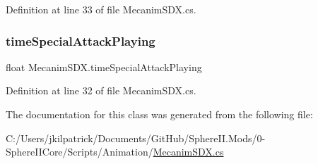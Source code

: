 Definition at line 33 of file Mecanim\+S\+D\+X.\+cs.

\mbox{\label{class_mecanim_s_d_x_af8baae6e70c21a065a3c0d9a2860e921}} 
\subsubsection{\texorpdfstring{timeSpecialAttackPlaying}{timeSpecialAttackPlaying}}
{\footnotesize\ttfamily float Mecanim\+S\+D\+X.\+time\+Special\+Attack\+Playing\hspace{0.3cm}{\ttfamily [protected]}}



Definition at line 32 of file Mecanim\+S\+D\+X.\+cs.



The documentation for this class was generated from the following file\+:\begin{DoxyCompactItemize}
\item 
C\+:/\+Users/jkilpatrick/\+Documents/\+Git\+Hub/\+Sphere\+I\+I.\+Mods/0-\/\+Sphere\+I\+I\+Core/\+Scripts/\+Animation/\mbox{\hyperlink{_mecanim_s_d_x_8cs}{Mecanim\+S\+D\+X.\+cs}}\end{DoxyCompactItemize}
